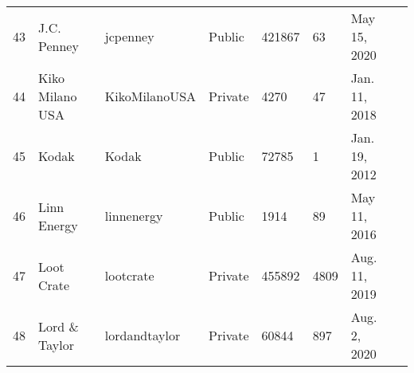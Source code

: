 \documentclass[9pt,twoside,lineno]{pnas-new}
\begin{document}
\begin{longtable}{llllllll}
43          & J.C. Penney                                                                     & jcpenney                                                            & Public           & 421867             & 63                 & May 15, 2020                                                                                                                          \\
44          & Kiko Milano USA                                                                 & KikoMilanoUSA                                                       & Private          & 4270               & 47                 & Jan. 11, 2018                                                                                                                      \\
45          & Kodak                                                                           & Kodak                                                               & Public           & 72785              & 1                  & Jan. 19, 2012                                                                                                                      \\
46          & Linn Energy                                                                     & linnenergy                                                          & Public           & 1914               & 89              & May 11, 2016                                                                                                                          \\
47          & Loot Crate                                                                      & lootcrate                                                           & Private          & 455892             & 4809               & Aug. 11, 2019                                                                                                                       \\
48          & Lord \& Taylor                                                                  & lordandtaylor                                                       & Private          & 60844              & 897                & Aug. 2, 2020                                                                                                                        \\

\end{longtable}
\end{document}
